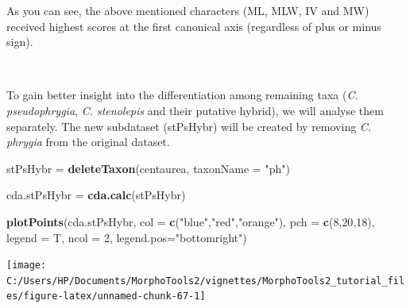 \documentclass[
]{article}
\newenvironment{Shaded}{\begin{snugshade}}{\end{snugshade}}
\newcommand{\DataTypeTok}[1]{\textcolor[rgb]{0.13,0.29,0.53}{#1}}
\newcommand{\DecValTok}[1]{\textcolor[rgb]{0.00,0.00,0.81}{#1}}
\newcommand{\KeywordTok}[1]{\textcolor[rgb]{0.13,0.29,0.53}{\textbf{#1}}}
\newcommand{\NormalTok}[1]{#1}
\newcommand{\StringTok}[1]{\textcolor[rgb]{0.31,0.60,0.02}{#1}}
\begin{document}
As you can see, the above mentioned characters (ML, MLW, IV and MW)
received highest scores at the first canonical axis (regardless of plus
or minus sign).

~\\
\hspace*{0.333em}

To gain better insight into the differentiation among remaining taxa
(\emph{C. pseudophrygia}, \emph{C. stenolepis} and their putative
hybrid), we will analyse them separately. The new subdataset (stPsHybr)
will be created by removing \emph{C. phrygia} from the original dataset.

\begin{Shaded}
\begin{Highlighting}[]
\NormalTok{stPsHybr =}\StringTok{ }\KeywordTok{deleteTaxon}\NormalTok{(centaurea, }\DataTypeTok{taxonName =} \StringTok{"ph"}\NormalTok{)}

\NormalTok{cda.stPsHybr =}\StringTok{ }\KeywordTok{cda.calc}\NormalTok{(stPsHybr)}

\KeywordTok{plotPoints}\NormalTok{(cda.stPsHybr, }\DataTypeTok{col =} \KeywordTok{c}\NormalTok{(}\StringTok{"blue"}\NormalTok{,}\StringTok{"red"}\NormalTok{,}\StringTok{"orange"}\NormalTok{), }\DataTypeTok{pch =} \KeywordTok{c}\NormalTok{(}\DecValTok{8}\NormalTok{,}\DecValTok{20}\NormalTok{,}\DecValTok{18}\NormalTok{), }
            \DataTypeTok{legend =}\NormalTok{ T, }\DataTypeTok{ncol =} \DecValTok{2}\NormalTok{, }\DataTypeTok{legend.pos=}\StringTok{"bottomright"}\NormalTok{)}
\end{Highlighting}
\end{Shaded}

\begin{center}\texttt{[image: C:/Users/HP/Documents/MorphoTools2/vignettes/MorphoTools2\_tutorial\_files/figure-latex/unnamed-chunk-67-1]} \end{center}
\end{document}

